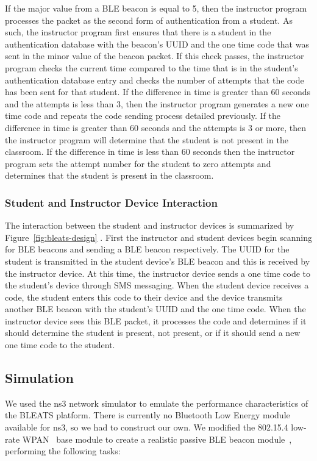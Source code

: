 If the major value from a BLE beacon is equal to 5, then the instructor program
processes the packet as the second form of authentication from a student. As
such, the instructor program first ensures that there is a student in the
authentication database with the beacon’s UUID and the one time code that was
sent in the minor value of the beacon packet. If this check passes, the
instructor program checks the current time compared to the time that is in the
student’s authentication database entry and checks the number of attempts that
the code has been sent for that student. If the difference in time is greater
than 60 seconds and the attempts is less than 3, then the instructor program
generates a new one time code and repeats the code sending process detailed
previously. If the difference in time is greater than 60 seconds and the
attempts is 3 or more, then the instructor program will determine that the
student is not present in the classroom. If the difference in time is less than
60 seconds then the instructor program sets the attempt number for the student
to zero attempts and determines that the student is present in the classroom. 

\subsubsection{Student and Instructor Device Interaction}

The interaction between the student and instructor devices is summarized by
Figure~\ref{fig:bleats-design} . First the instructor and student devices begin
scanning for BLE beacons and sending a BLE beacon respectively. The UUID for
the student is transmitted in the student device’s BLE beacon and this is
received by the instructor device. At this time, the instructor device sends a
one time code to the student’s device through SMS messaging. When the student
device receives a code, the student enters this code to their device and the
device transmits another BLE beacon with the student’s UUID and the one time
code. When the instructor device sees this BLE packet, it processes the code
and determines if it should determine the student is present, not present, or
if it should send a new one time code to the student.

\subsection{Simulation}

We used the ns3 network simulator to emulate the performance characteristics of
the BLEATS platform. There is currently no Bluetooth Low Energy module
available for ns3, so we had to construct our own. We modified the 802.15.4
low-rate WPAN~\cite{802-15-4-spec} base module to create a realistic passive
BLE beacon module~\cite{ble-spec}, performing the following tasks: 

